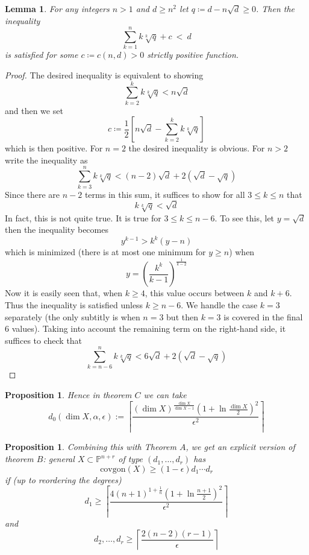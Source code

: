 \documentclass[fontsize=11pt]{amsart}
\newtheorem{lemma}[thm]{Lemma}
\newtheorem{prop}[thm]{Proposition}
\begin{document}
\begin{lemma}\label{numerical}
For any integers $n > 1$ and $d \ge n^2$ let $q \coloneqq d - n \sqrt{d} \ge 0$. Then the inequality
$$\sum_{k=1}^{n} k \sqrt[k]{q} + c \ <\ d$$
is satisfied for some $c \coloneqq c(n,d) > 0$ strictly positive function.
\end{lemma}

\begin{proof}
The desired inequality is equivalent to showing
\[ \sum_{k = 2}^k k \sqrt[k]{q} < n \sqrt{d} \]
and then we set
\[ c \coloneqq \frac{1}{2} \left[ n \sqrt{d} - \sum_{k = 2}^k k \sqrt[k]{q} \right] \]
which is then positive. For $n = 2$ the desired inequality is obvious. For $n > 2$ write the inequality as
\[ \sum_{k = 3}^n k \sqrt[k]{q} < (n-2) \sqrt{d} + 2(\sqrt{d} - \sqrt{q}) \]
Since there are $n-2$ terms in this sum, it suffices to show for all $3 \le k \le n$ that
\[ k \sqrt[k]{q} < \sqrt{d} \]
In fact, this is not quite true. It is true for $3 \le k \le n - 6$. To see this, let $y = \sqrt{d}$ then the inequality becomes
\[ y^{k-1} > k^k (y - n) \]
which is minimized (there is at most one minimum for $y \ge n$) when
\[ y = \left( \frac{k^k}{k-1} \right)^{\frac{1}{k-2}} \]
Now it is easily seen that, when $k \ge 4$, this value occurs between $k$ and $k + 6$. Thus the inequality is satisfied unless $k \ge n - 6$. We handle the case $k = 3$ separately (the only subtitly is when $n = 3$ but then $k = 3$ is covered in the final $6$ values). Taking into account the remaining term on the right-hand side, it suffices to check that
\[ \sum_{k = n - 6}^n k \sqrt[k]{q} < 6 \sqrt{d} + 2 (\sqrt{d} - \sqrt{q}) \] 
\end{proof}

\begin{prop}
Hence in theorem $C$ we can take
\[ d_0(\dim{X}, \alpha, \epsilon) := \left\lceil \frac{(\dim{X})^{\frac{\dim{X}}{\dim{X}-1}} (1 + \ln{\frac{\dim{X}}{2}})^2}{\epsilon^2} \right\rceil \]
\end{prop}

\begin{prop}
Combining this with Theorem $A$, we get an explicit version of theorem $B$: general $X \subset \mathbb{P}^{n+r}$ of type $(d_1, \dots, d_r)$ has 
\[ \mathrm{covgon}(X) \ge (1-\epsilon) d_1 \cdots d_r \]
if (up to reordering the degrees)
\[ d_1 \ge  \left\lceil \frac{4 (n+1)^{1 + \frac{1}{n}} (1 + \ln{\frac{n+1}{2}})^2}{\epsilon^2} \right\rceil \]
and
\[ d_2, \dots, d_r \ge  \left\lceil \frac{2(n-2)(r-1)}{\epsilon} \right\rceil \]
\end{prop}
\end{document}

